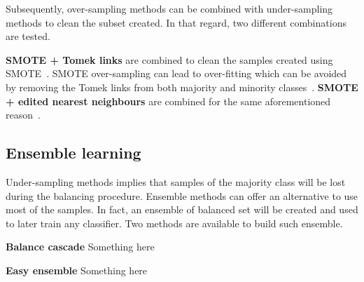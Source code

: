 \documentclass[twoside,11pt]{article}
\begin{document}
Subsequently, over-sampling methods can be combined with under-sampling methods to clean the subset created.
In that regard, two different combinations are tested.

\textbf{SMOTE + Tomek links} are combined to clean the samples created using SMOTE~\citep{batista2003balancing}.
SMOTE over-sampling can lead to over-fitting which can be avoided by removing the Tomek links from both majority and minority classes~\citep{prati2009data}.
\textbf{SMOTE + edited nearest neighbours} are combined for the same aforementioned reason~\citep{batista2004study}.

\subsection{Ensemble learning}

Under-sampling methods implies that samples of the majority class will be lost during the balancing procedure.
Ensemble methods can offer an alternative to use most of the samples.
In fact, an ensemble of balanced set will be created and used to later train any classifier.
Two methods are available to build such ensemble.

\textbf{Balance cascade} Something here

\textbf{Easy ensemble} Something here
\end{document}
